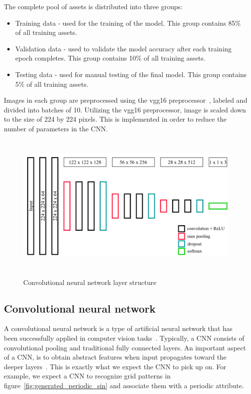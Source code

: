 \documentclass[a4paper,12pt,fleqn]{article}
\begin{document}
The complete pool of assets is distributed into three groups:
\begin{itemize}
  \item Training data - used for the training of the model. This group contains 85\% of all training assets.
  \item Validation data - used to validate the model accuracy after each training epoch completes. This group contains 10\% of all training assets.
  \item Testing data - used for manual testing of the final model. This group contains 5\% of all training assets.
\end{itemize}
Images in each group are preprocessed using the vgg16 preprocessor~\cite{brusilovsky:simonyan2014very}, labeled and divided into
batches of 10.
Utilizing the vgg16 preprocessor, image is scaled down to the size of 224 by 224 pixels.
This is implemented in order to reduce the number of parameters in the CNN.


\begin{figure}[h]
  \centering
  {\includegraphics[height=7cm]{assets/cnn_layers.png}}
  \caption{Convolutional neural network layer structure}
  \label{fig:cnn_layers}
\end{figure}


\subsection{Convolutional neural network}
A convolutional neural network is a type of artificial neural network that has been successfully applied in computer vision tasks~\cite{recent_advances_in_cnn}.
Typically, a CNN consists of convolutional pooling and traditional fully connected layers.
An important aspect of a CNN, is to obtain abstract features when input propagates toward the deeper layers~\cite{understanding_cnn}.
This is exactly what we expect the CNN to pick up on.
For example, we expect a CNN to recognize grid patterns in figure~\ref{fig:generated_periodic_sin} and associate them with a periodic attribute.
\end{document}

